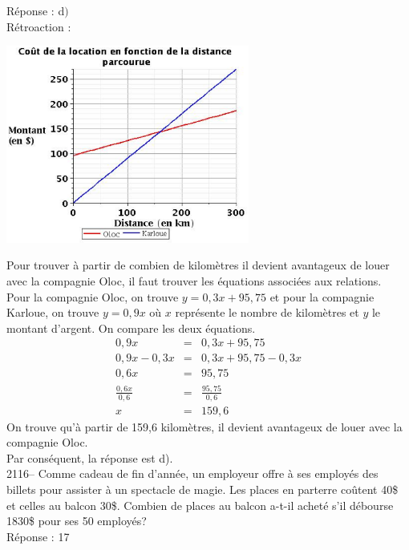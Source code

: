 \documentclass[letterpaper, 12pt]{article}
\begin{document}
R\'eponse : d$)$\\

R\'etroaction :\\
\begin{center}
 \includegraphics[width=8cm,bb=14 14 505 415]{Q2104a.eps}
\end{center}
Pour trouver \`a partir de combien de kilom\`etres il devient avantageux de louer avec la compagnie Oloc, il faut trouver les \'equations associ\'ees aux relations.\\

Pour la compagnie Oloc, on trouve $y=0,3x+95,75$ et pour la compagnie Karloue, on trouve $ y=0,9x$  o\`u $x$ repr\'esente le nombre de kilom\`etres et $y$ le montant d'argent. On compare les deux \'equations.
\begin{eqnarray*}
 0,9x&=&0,3x+95,75\\
 0,9x-0,3x&=&0,3x+95,75-0,3x\\
 0,6x&=&95,75\\[2mm]
\frac{0,6x}{0,6}&=&\frac{95,75}{0,6}\\[2mm]
x&=&159,6
\end{eqnarray*}
On trouve qu'\`a partir de 159,6 kilom\`etres, il devient avantageux de louer avec la compagnie Oloc.\\
Par cons\'equent, la r\'eponse est d).\\

2116-- Comme cadeau de fin d'ann\'ee, un employeur offre \`a ses employ\'es des billets pour assister \`a un spectacle de magie. Les places en parterre co\^utent 40\$ et celles au balcon 30\$. Combien de places au balcon a-t-il achet\'e s'il d\'ebourse 1830\$ pour ses 50 employ\'es?\\

R\'eponse : 17\\
\end{document}
